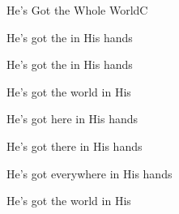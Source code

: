 \begin{SBSong}{He's Got the Whole World}{C}
\begin{SBVerse}
    He's got the  in His hands

    He's got the  in His hands

    He's got the  world in His 
  \end{SBVerse}
  \begin{SBVerse}
    He's got  here in His hands

    He's got  there in His hands

    He's got  everywhere in His hands

    He's got the  world in His 
  \end{SBVerse}
\end{SBSong}
    
